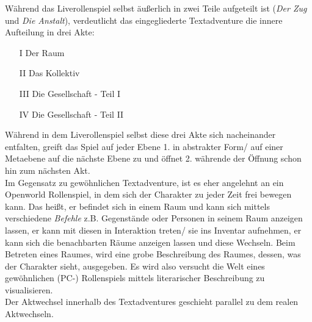 \documentclass[a4paper, 12pt]{scrartcl}
\begin{document}
    Während das Liverollenspiel selbst äußerlich in zwei Teile aufgeteilt ist (\textit{Der Zug} und \textit{Die Anstalt}), verdeutlicht das eingegliederte Textadventure die innere Aufteilung in drei Akte: 
    \begin{itemize}
    \item[I] Der Raum
    \item[II] Das Kollektiv 
    \item[III] Die Gesellschaft - Teil I
    \item[IV] Die Gesellschaft - Teil II
    \end{itemize}
    Während in dem Liverollenspiel selbst diese drei Akte sich nacheinander entfalten, greift das Spiel auf jeder Ebene 1. in abstrakter Form/ auf einer Metaebene auf die nächste Ebene zu und öffnet 2. währende der Öffnung schon hin zum nächsten Akt. \\
    Im Gegensatz zu \glqq gewöhnlichen\grqq{} Textadventure, ist es eher angelehnt an ein Openworld Rollenspiel, in dem sich der Charakter zu jeder Zeit frei bewegen kann.
    Das heißt, er befindet sich in einem Raum und kann sich mittels verschiedene \textit{Befehle} z.B. Gegenstände oder Personen in seinem Raum anzeigen lassen, er kann mit diesen in Interaktion treten/ sie ins Inventar aufnehmen, er kann sich die benachbarten Räume anzeigen lassen und diese Wechseln. 
    Beim Betreten eines Raumes, wird eine grobe Beschreibung des Raumes, dessen, was der Charakter sieht, ausgegeben. 
    Es wird also versucht die Welt eines gewöhnlichen (PC-) Rollenspiels mittels literarischer Beschreibung zu visualisieren. \\
    Der Aktwechsel innerhalb des Textadventures geschieht parallel zu dem realen Aktwechseln. 
\end{document}
